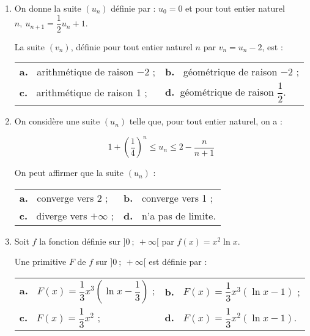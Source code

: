 \documentclass[10pt,a4paper]{article}
\begin{document}
\begin{enumerate}
\item On donne la suite $\left(u_n\right)$ définie par : $u_0 = 0$ et pour tout entier naturel $n,\: u_{n+1} = \dfrac12 u_n + 1$.

La suite $\left(v_n\right)$, définie pour tout entier naturel $n$ par $v_n = u_n  - 2$, est :

\begin{center}
\begin{tabularx}{\linewidth}{*{2}{X}}
\textbf{a.~} arithmétique de raison $- 2$ ;&\textbf{b.~} géométrique de raison $- 2$ ;\\
\textbf{c.~} arithmétique de raison 1 ;&\textbf{d.~}géométrique de raison  $\dfrac12$.\\
\end{tabularx}
\end{center}

\item  On considère une suite $\left(u_n\right)$ telle que, pour tout entier naturel, on a :

\[1  + \left(\dfrac14\right)^n \leqslant u_n \leqslant 2 - \dfrac{n}{n+1}\]

On peut affirmer que la suite $\left(u_n\right)$ :

\begin{center}
\begin{tabularx}{\linewidth}{*{2}{X}}
\textbf{a.~} converge vers 2 ; &\textbf{b.~} converge vers 1 ;\\
\textbf{c.~} diverge vers $+ \infty$ ;&\textbf{d.~} n'a pas de limite.\\
\end{tabularx}
\end{center}

\item Soit $f$ la fonction définie sur $]0~;~+\infty[$ par $f(x) = x^2 \ln x$.

Une primitive $F$ de $f$ sur $]0~;~+\infty[$ est définie par :

\begin{center}
\begin{tabularx}{\linewidth}{*{2}{X}}
\textbf{a.~} $F(x) = \dfrac13 x^3 \left(\ln x - \dfrac13 \right)$ ;&\textbf{b.~} $F(x) = \dfrac13 x^3 (\ln x - 1)$ ;\\[8pt]
\textbf{c.~} $F(x) = \dfrac13 x^2$ ;&\textbf{d.~} $F(x) = \dfrac13 x^2 (\ln x - 1)$.\\
\end{tabularx}
\end{center}


\end{enumerate}
\end{document}

